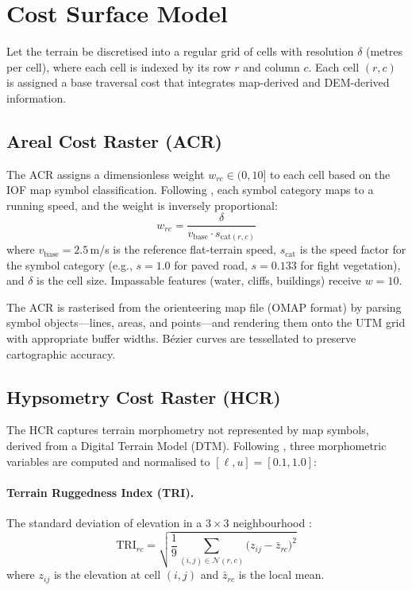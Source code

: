 \documentclass[preprint,11pt]{elsarticle}
\begin{document}
\section{Cost Surface Model}
\label{sec:cost}

Let the terrain be discretised into a regular grid of cells with resolution $\delta$ (metres per cell), where each cell is indexed by its row $r$ and column $c$.
Each cell $(r,c)$ is assigned a base traversal cost that integrates map-derived and DEM-derived information.

\subsection{Areal Cost Raster (ACR)}
\label{sec:acr}

The ACR assigns a dimensionless weight $w_{rc} \in (0, 10]$ to each cell based on the IOF map symbol classification.
Following \citet{ica2021lcp}, each symbol category maps to a running speed, and the weight is inversely proportional:
\begin{equation}
  w_{rc} = \frac{\delta}{v_{\text{base}} \cdot s_{\text{cat}(r,c)}}
  \label{eq:acr}
\end{equation}
where $v_{\text{base}} = 2.5$\,m/s is the reference flat-terrain speed, $s_{\text{cat}}$ is the speed factor for the symbol category (e.g., $s = 1.0$ for paved road, $s = 0.133$ for fight vegetation), and $\delta$ is the cell size.
Impassable features (water, cliffs, buildings) receive $w = 10$.

The ACR is rasterised from the orienteering map file (OMAP format) by parsing symbol objects---lines, areas, and points---and rendering them onto the UTM grid with appropriate buffer widths.
B\'{e}zier curves are tessellated to preserve cartographic accuracy.

\subsection{Hypsometry Cost Raster (HCR)}
\label{sec:hcr}

The HCR captures terrain morphometry not represented by map symbols, derived from a Digital Terrain Model (DTM).
Following \citet{ica2021lcp}, three morphometric variables are computed and normalised to $[\ell, u] = [0.1, 1.0]$:

\paragraph{Terrain Ruggedness Index (TRI).}
The standard deviation of elevation in a $3 \times 3$ neighbourhood \citep{riley1999tri}:
\begin{equation}
  \text{TRI}_{rc} = \sqrt{\frac{1}{9}\sum_{(i,j) \in \mathcal{N}(r,c)} \bigl(z_{ij} - \bar{z}_{rc}\bigr)^2}
  \label{eq:tri}
\end{equation}
where $z_{ij}$ is the elevation at cell $(i,j)$ and $\bar{z}_{rc}$ is the local mean.
\end{document}
